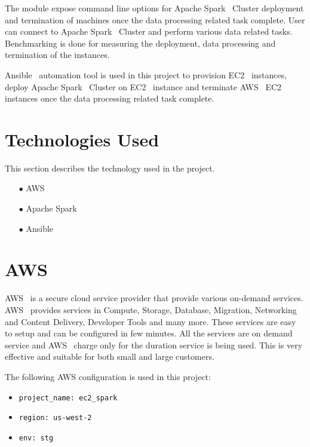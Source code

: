 The module expose command line options for Apache
Spark~\cite{hid-sp18-511-www-spark} Cluster deployment and termination
of machines once the data processing related task complete. User can connect to Apache
Spark~\cite{hid-sp18-511-www-spark} Cluster and perform various data
related tasks. Benchmarking is done for measuring the deployment, data
processing and termination of the instances.

Ansible~\cite{hid-sp18-511-www-ansible} automation tool is used in
this project to provision EC2~\cite{hid-sp18-511-www-ec2} instances,
deploy Apache Spark~\cite{hid-sp18-511-www-spark} Cluster on
EC2~\cite{hid-sp18-511-www-ec2} instance and terminate AWS~\cite{hid-sp18-511-www-aws} EC2~\cite{hid-sp18-511-www-ec2}
instances once the data processing related task complete.

\section{Technologies Used}
This section describes the technology used in the project.

\begin{itemize}
	\item[$\bullet$] AWS 
	\item[$\bullet$] Apache Spark 
	\item[$\bullet$] Ansible
\end{itemize}

\section{AWS}

AWS~\cite{hid-sp18-511-www-aws} is a secure cloud service provider
that provide various on-demand services.
AWS~\cite{hid-sp18-511-www-aws} provides services in Compute, Storage,
Database, Migration, Networking and Content Delivery, Developer Tools
and many more. These services are easy to setup and can be configured
in few minutes. All the services are on demand service and
AWS~\cite{hid-sp18-511-www-aws} charge only for the duration service
is being used. This is very effective and suitable for both small and
large customers.

The following AWS configuration is used in this project:

\begin{itemize}
	\item \verb|project_name: ec2_spark|
	\item \verb|region: us-west-2|
	\item \verb|env: stg|
\end{itemize}


